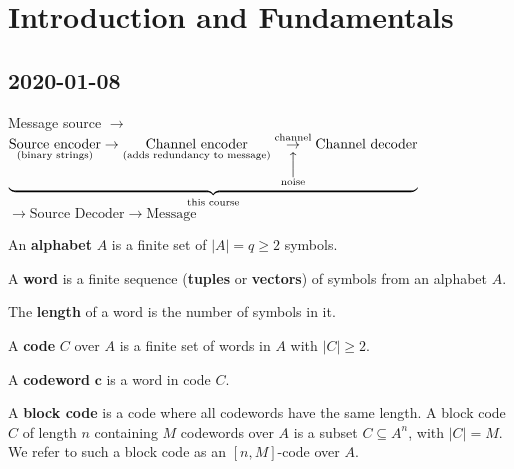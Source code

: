 \chapter{Introduction and Fundamentals}
\section{2020-01-08}
Message source
$ \rightarrow $
$ \underbrace{
 \underset{\text{(binary strings)}}{\text{Source encoder}} 
 \rightarrow 
 \underset{\text{(adds redundancy to message)}}{\text{Channel encoder}} 
 \underset{\overset{\Big\uparrow}{\text{noise}}}{\overset{\text{channel}}{\rightarrow}} 
\text{Channel decoder}}_{\text{this course}}$
$ \rightarrow \text{Source Decoder} \rightarrow \text{Message} $

\begin{defbox}
    \begin{definition}
        An \textbf{alphabet} $ A $ is a finite set of $ |A|= q\geqslant 2 $ symbols.
    \end{definition}
\end{defbox}

\begin{defbox}
    \begin{definition}
    A \textbf{word} is a finite sequence (\textbf{tuples} or \textbf{vectors})
    of symbols from an alphabet $ A $.
\end{definition} \end{defbox}

\begin{defbox}
    \begin{definition}
    The \textbf{length} of a word is the number of symbols in it.
\end{definition} \end{defbox}

\begin{defbox}
    \begin{definition}
    A \textbf{code} $ C $ over $ A $ is a finite set of words in $ A $
    with $ |C|\geqslant 2 $.
\end{definition} \end{defbox}

\begin{defbox}
    \begin{definition}
    A \textbf{codeword} $ \bm{c} $ is a word in code $ C $.
\end{definition} \end{defbox}

\begin{defbox}
    \begin{definition}
    A \textbf{block code} is a code where all codewords have the same length.
    A block code $ C $ of length $ n $ containing $ M $ codewords over $ A $
    is a subset $ C\subseteq A^n $, with $ |C|=M $. We refer to such a block
    code as an $ [n,M] $-code over $ A $.
    \end{definition}
\end{defbox}

